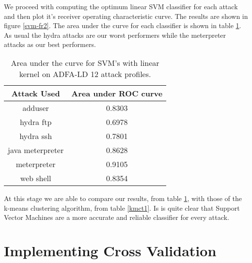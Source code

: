 \documentclass[reqno,openany,12pt]{amsbook}
\begin{document}
We proceed with computing the optimum linear SVM classifier for each attack and then plot it's receiver operating characteristic curve. The results are shown in figure \ref{svm-fr2}. The area under the curve for each classifier is shown in table \ref{svmt2}. As usual the hydra attacks are our worst performers while the meterpreter attacks as our best performers.

\begin{table}
\begin{tabular}{|c|c|}
\hline
Attack Used &  Area under ROC curve \\ \hline 
adduser          & 0.8303 \\ \hline
hydra ftp        & 0.6978 \\ \hline
hydra ssh        & 0.7801 \\ \hline
java meterpreter & 0.8628 \\ \hline
meterpreter      & 0.9105 \\ \hline
web shell        & 0.8354 \\ \hline
\end{tabular}
\vspace{5pt}
\caption{Area under the curve for SVM's with linear kernel on ADFA-LD 12 attack profiles.}
\label{svmt2}
\end{table}


At this stage we are able to compare our results, from table \ref{svmt2}, with those of the k-means clustering algorithm, from table \ref{kmct1}. Is is quite clear that Support Vector Machines are a more accurate and reliable classifier for every attack.

%
%

%
%



\section{Implementing Cross Validation}
\end{document}
